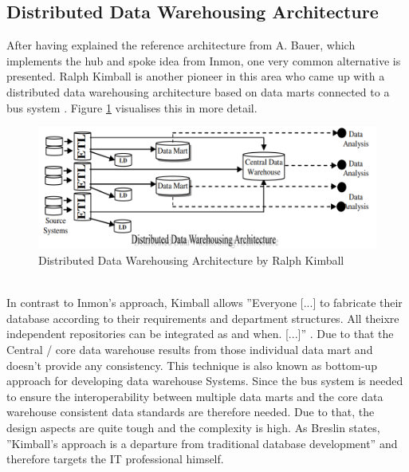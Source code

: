 \subsection{Distributed Data Warehousing Architecture}
After having explained the reference architecture from A. Bauer, which implements the hub and spoke idea from Inmon, one very common alternative is presented. Ralph Kimball is another pioneer in this area who came up with a distributed data warehousing architecture based on data marts connected to a bus system \cite{surveyDWSArchs}. Figure \ref{fig:distributedWarehouseArchitecture} visualises this in more detail.
\begin{figure}[htb]
    \centering
    \includegraphics[scale=0.5]{pictures/DistributedDataWarehouseArchitecture.PNG}
    \caption{Distributed Data Warehousing Architecture by Ralph Kimball \cite{surveyDWSArchs}}
    \label{fig:distributedWarehouseArchitecture}
\end{figure}
\\In contrast to Inmon's approach, Kimball allows ''Everyone [...] to fabricate their database according to their requirements and department structures. All theixre independent repositories can be integrated as and when. [...]'' \cite{surveyDWSArchs}. Due to that the Central / core data warehouse results from those individual data mart and doesn't provide any consistency. This technique is also known as bottom-up approach for developing data warehouse Systems. Since the bus system is needed to ensure the interoperability between multiple data marts and the core data warehouse consistent data standards are therefore needed. Due to that, the design aspects are quite tough and the complexity is high. \cite{KimbalVSInmon}\newline
As Breslin states, ''Kimball's approach is a departure from traditional database development'' \cite[p.~19]{KimbalVSInmon} and therefore targets the IT professional himself.\newline

